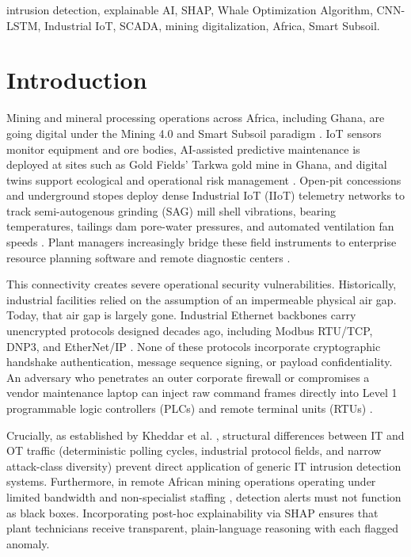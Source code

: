 \documentclass[conference]{IEEEtran}
\begin{document}
\begin{IEEEkeywords}
intrusion detection, explainable AI, SHAP, Whale Optimization Algorithm, CNN-LSTM, Industrial IoT, SCADA, mining digitalization, Africa, Smart Subsoil.
\end{IEEEkeywords}

\section{Introduction}
Mining and mineral processing operations across Africa, including Ghana, are going digital under the Mining 4.0 and Smart Subsoil paradigm \cite{litvinenko2020digital, oyedotun2025deep, itonline2026digital}. IoT sensors monitor equipment and ore bodies, AI-assisted predictive maintenance is deployed at sites such as Gold Fields' Tarkwa gold mine in Ghana, and digital twins support ecological and operational risk management \cite{nigerianmineralexchange2025smart, itonline2026digital}. Open-pit concessions and underground stopes deploy dense Industrial IoT (IIoT) telemetry networks to track semi-autogenous grinding (SAG) mill shell vibrations, bearing temperatures, tailings dam pore-water pressures, and automated ventilation fan speeds \cite{boudina2023towards, rosendahl2020digital}. Plant managers increasingly bridge these field instruments to enterprise resource planning software and remote diagnostic centers \cite{hock2022cyber}. 

This connectivity creates severe operational security vulnerabilities. Historically, industrial facilities relied on the assumption of an impermeable physical air gap. Today, that air gap is largely gone. Industrial Ethernet backbones carry unencrypted protocols designed decades ago, including Modbus RTU/TCP, DNP3, and EtherNet/IP \cite{stouffer2023guide, alanazi2022scada, hsu2017modbus}. None of these protocols incorporate cryptographic handshake authentication, message sequence signing, or payload confidentiality. An adversary who penetrates an outer corporate firewall or compromises a vendor maintenance laptop can inject raw command frames directly into Level 1 programmable logic controllers (PLCs) and remote terminal units (RTUs) \cite{cardenas2011attacks, butko2022cyber, africanminingmarket2024cybersecurity}.

Crucially, as established by Kheddar et al. \cite{kheddar2023deep}, structural differences between IT and OT traffic (deterministic polling cycles, industrial protocol fields, and narrow attack-class diversity) prevent direct application of generic IT intrusion detection systems. Furthermore, in remote African mining operations operating under limited bandwidth and non-specialist staffing \cite{itonline2026digital}, detection alerts must not function as black boxes. Incorporating post-hoc explainability via SHAP \cite{lundberg2017unified, oyedotun2025towards} ensures that plant technicians receive transparent, plain-language reasoning with each flagged anomaly.
\end{document}
